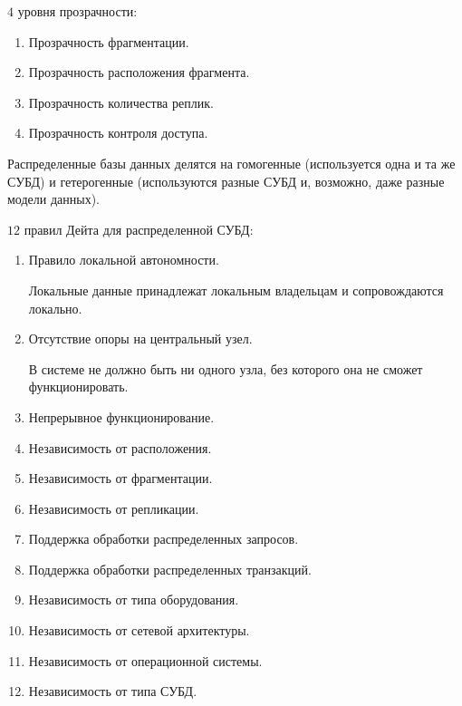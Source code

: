 \(4\) уровня прозрачности:

\begin{enumerate}
\item
  Прозрачность фрагментации.

\item
  Прозрачность расположения фрагмента.

\item
  Прозрачность количества реплик.

\item
  Прозрачность контроля доступа.
\end{enumerate}

Распределенные базы данных делятся на гомогенные (используется одна и та же
СУБД) и гетерогенные (используются разные СУБД и, возможно, даже разные модели
данных).

\(12\) правил Дейта для распределенной СУБД:

\begin{enumerate}
\item
  Правило локальной автономности.

  Локальные данные принадлежат локальным владельцам и сопровождаются локально.

\item
  Отсутствие опоры на центральный узел.

  В системе не должно быть ни одного узла, без которого она не сможет
  функционировать.

\item
  Непрерывное функционирование.

\item
  Независимость от расположения.

\item
  Независимость от фрагментации.

\item
  Независимость от репликации.

\item
  Поддержка обработки распределенных запросов.

\item
  Поддержка обработки распределенных транзакций.

\item
  Независимость от типа оборудования.

\item
  Независимость от сетевой архитектуры.

\item
  Независимость от операционной системы.

\item
  Независимость от типа СУБД.
\end{enumerate}

